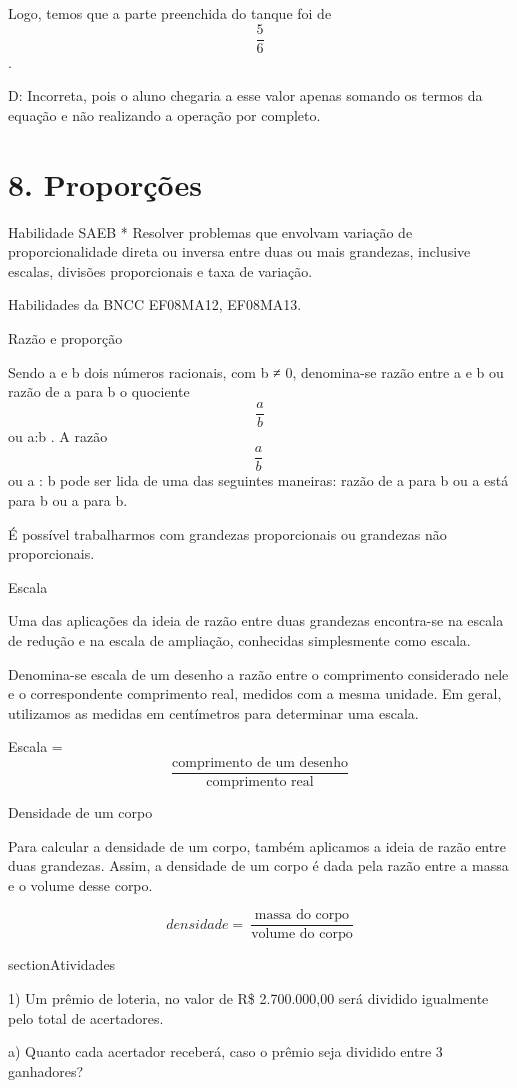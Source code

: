 Logo, temos que a parte preenchida do tanque foi de \[\frac{5}{6}\].

D: Incorreta, pois o aluno chegaria a esse valor apenas somando os
termos da equação e não realizando a operação por completo.


\section{8. Proporções}

Habilidade SAEB * Resolver problemas que envolvam variação de
proporcionalidade direta ou inversa entre duas ou mais grandezas,
inclusive escalas, divisões proporcionais e taxa de variação.

Habilidades da BNCC EF08MA12, EF08MA13.

Razão e proporção

Sendo a e b dois números racionais, com b ≠ 0, denomina-se razão entre a
e b ou razão de a para b o quociente \[\frac{a}{b}\] ou a:b . A razão
\[\frac{a}{b}\ \] ou a : b pode ser lida de uma das seguintes maneiras:
razão de a para b ou a está para b ou a para b.

É possível trabalharmos com grandezas proporcionais ou grandezas não
proporcionais.

Escala

Uma das aplicações da ideia de razão entre duas grandezas encontra-se na
escala de redução e na escala de ampliação, conhecidas simplesmente como
escala.

Denomina-se escala de um desenho a razão entre o comprimento considerado
nele e o correspondente comprimento real, medidos com a mesma unidade.
Em geral, utilizamos as medidas em centímetros para determinar uma
escala.

Escala =
\[\frac{\text{comprimento\ de\ um\ desenho}}{\text{comprimento\ real}}\]

Densidade de um corpo

Para calcular a densidade de um corpo, também aplicamos a ideia de razão
entre duas grandezas. Assim, a densidade de um corpo é dada pela razão
entre a massa e o volume desse corpo.

\[densidade = \ \frac{\text{massa\ do\ corpo}}{\text{volume\ do\ corpo}}\]

section{Atividades}

1) Um prêmio de loteria, no valor de R\$ 2.700.000,00 será dividido
igualmente pelo total de acertadores.

a) Quanto cada acertador receberá, caso o prêmio seja dividido entre 3
ganhadores?

